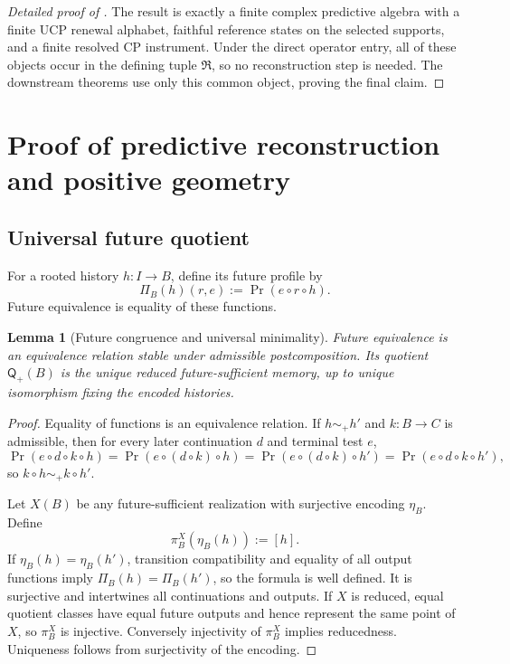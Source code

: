 \documentclass[11pt]{article}
\newtheorem{lemma}[theorem]{Lemma}
\theoremstyle{definition}
\theoremstyle{remark}
\newcommand{\Qq}{\mathsf Q}
\begin{document}
\begin{proof}[Detailed proof of ]
The result is exactly a finite complex predictive algebra with a finite UCP
renewal alphabet, faithful reference states on the selected supports, and a
finite resolved CP instrument.  Under the direct operator entry, all of these
objects occur in the defining tuple $\mathfrak R$, so no reconstruction step is
needed.  The downstream theorems use only this common object, proving the final
claim.
\end{proof}

\section{Proof of predictive reconstruction and positive geometry}
\label{app:proof-predictive-geometry}

\subsection{Universal future quotient}

For a rooted history $h:I\to B$, define its future profile by
\[
  \Pi_B(h)(r,e):=\Pr(e\circ r\circ h).
\]
Future equivalence is equality of these functions.

\begin{lemma}[Future congruence and universal minimality]
\label{lem:app-future-minimality}
Future equivalence is an equivalence relation stable under admissible
postcomposition.  Its quotient $\Qq_+(B)$ is the unique reduced
future-sufficient memory, up to unique isomorphism fixing the encoded histories.
\end{lemma}

\begin{proof}
Equality of functions is an equivalence relation.  If $h\sim_+h'$ and
$k:B\to C$ is admissible, then for every later continuation $d$ and terminal
test $e$,
\[
 \Pr(e\circ d\circ k\circ h)
 =\Pr(e\circ(d\circ k)\circ h)
 =\Pr(e\circ(d\circ k)\circ h')
 =\Pr(e\circ d\circ k\circ h'),
\]
so $k\circ h\sim_+k\circ h'$.

Let $X(B)$ be any future-sufficient realization with surjective encoding
$\eta_B$.  Define
\[
  \pi_B^X(\eta_B(h)):=[h].
\]
If $\eta_B(h)=\eta_B(h')$, transition compatibility and equality of all output
functions imply $\Pi_B(h)=\Pi_B(h')$, so the formula is well defined.  It is
surjective and intertwines all continuations and outputs.  If $X$ is reduced,
equal quotient classes have equal future outputs and hence represent the same
point of $X$, so $\pi_B^X$ is injective.  Conversely injectivity of $\pi_B^X$
implies reducedness.  Uniqueness follows from surjectivity of the encoding.
\end{proof}
\end{document}
